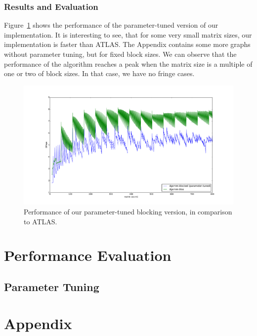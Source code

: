 \documentclass[12pt]{article}
\begin{document}
\subsubsection{Results and Evaluation}
Figure~\ref{fig:param_results} shows the performance of the parameter-tuned version of our implementation. It is interesting to see, that for some very small matrix sizes, our implementation is faster than ATLAS. The Appendix contains some more graphs without parameter tuning, but for fixed block sizes. We can observe that the performance of the algorithm reaches a peak when the matrix size is a multiple of one or two of block sizes. In that case, we have no fringe cases.
\begin{figure}
	\includegraphics[width=\textwidth]{graphs/profiles/PROFILE_BLOCKED.pdf}
	\caption{Performance of our parameter-tuned blocking version, in comparison to ATLAS.}
	\label{fig:param_results}
\end{figure}

\section{Performance Evaluation}
\subsection{Parameter Tuning}

\newpage
\section*{Appendix}
\end{document}
